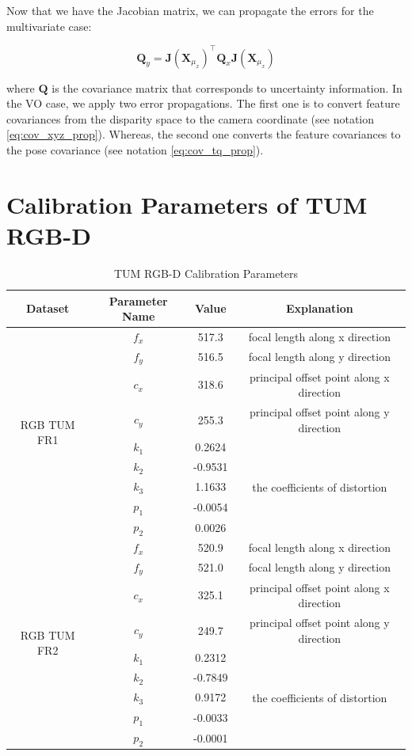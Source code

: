 \documentclass[12pt]{report}
\numberwithin{figure}{section}
\begin{document}
\begin{appendices}
Now that we have the Jacobian matrix, we can propagate the errors for 
the multivariate case:

\begin{equation}
  \mathbf{Q}_y = \mathbf{J}(\mathbf{X}_{\mu_x})^\top \mathbf{Q}_x 
  \mathbf{J}(\mathbf{X}_{\mu_x})
\end{equation}

where $\mathbf{Q}$ is the covariance matrix that corresponds to uncertainty information.
In the VO case, we apply two error propagations. The first one is to convert 
feature covariances from the disparity space to the camera coordinate 
(see notation \eqref{eq:cov_xyz_prop}). Whereas, the second one converts 
the feature covariances to the pose covariance (see notation 
\eqref{eq:cov_tq_prop}).

\section{Calibration Parameters of TUM RGB-D}

\begin{table}[H]
	\caption{TUM RGB-D Calibration Parameters}
	\centering
  \begin{tabular}{c|c|c|c}
    Dataset & Parameter Name & Value & Explanation\\
    \hline
    \multirow{9}{*}{RGB TUM FR1} & $f_x$ & 517.3 & focal length along x 
    direction\\
    & $f_y$ & 516.5 & focal length along y direction\\
    & $c_x$ & 318.6 & principal offset point along x direction\\
    & $c_y$ & 255.3 & principal offset point along y direction\\
    & $k_1$ & 0.2624 & \multirow{5}{*}{the coefficients of distortion}\\
    & $k_2$ & -0.9531 & \\
    & $k_3$ & 1.1633 & \\
    & $p_1$ & -0.0054 & \\
    & $p_2$ & 0.0026 & \\
    \hline
    \multirow{9}{*}{RGB TUM FR2} & $f_x$ & 520.9 & focal length along x 
    direction\\
    & $f_y$ & 521.0 & focal length along y direction\\
    & $c_x$ & 325.1 & principal offset point along x direction\\
    & $c_y$ & 249.7 & principal offset point along y direction\\
    & $k_1$ & 0.2312 & \multirow{5}{*}{the coefficients of distortion}\\
    & $k_2$ & -0.7849 & \\
    & $k_3$ & 0.9172 & \\
    & $p_1$ & -0.0033 & \\
    & $p_2$ & -0.0001 & \\
\end{tabular}	
\label{tb:tum_calib_param}
\end{table}



\end{appendices}
\end{document}

